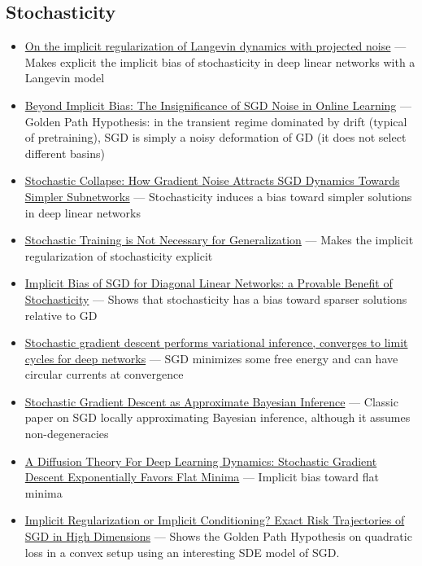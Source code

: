 \documentclass[11pt]{article}
\begin{document}
\subsection*{Stochasticity}
\begin{itemize}
  \item \href{https://arxiv.org/abs/2602.12257}{On the implicit regularization of Langevin dynamics with projected noise} --- Makes explicit the implicit bias of stochasticity in deep linear networks with a Langevin model
  \item \href{https://arxiv.org/abs/2306.08590}{Beyond Implicit Bias: The Insignificance of SGD Noise in Online Learning} --- Golden Path Hypothesis: in the transient regime dominated by drift (typical of pretraining), SGD is simply a noisy deformation of GD (it does not select different basins)
  \item \href{https://arxiv.org/abs/2306.04251}{Stochastic Collapse: How Gradient Noise Attracts SGD Dynamics Towards Simpler Subnetworks} --- Stochasticity induces a bias toward simpler solutions in deep linear networks
  \item \href{https://arxiv.org/abs/2109.14119}{Stochastic Training is Not Necessary for Generalization} --- Makes the implicit regularization of stochasticity explicit
  \item \href{https://arxiv.org/abs/2106.09524}{Implicit Bias of SGD for Diagonal Linear Networks: a Provable Benefit of Stochasticity} --- Shows that stochasticity has a bias toward sparser solutions relative to GD
  \item \href{https://arxiv.org/abs/1710.11029}{Stochastic gradient descent performs variational inference, converges to limit cycles for deep networks} --- SGD minimizes some free energy and can have circular currents at convergence
  \item \href{https://arxiv.org/abs/1704.04289}{Stochastic Gradient Descent as Approximate Bayesian Inference} --- Classic paper on SGD locally approximating Bayesian inference, although it assumes non-degeneracies
  \item \href{https://arxiv.org/abs/2002.03495}{A Diffusion Theory For Deep Learning Dynamics: Stochastic Gradient Descent Exponentially Favors Flat Minima} --- Implicit bias toward flat minima
  \item \href{https://arxiv.org/abs/2205.07069}{Implicit Regularization or Implicit Conditioning? Exact Risk Trajectories of SGD in High Dimensions} --- Shows the Golden Path Hypothesis on quadratic loss in a convex setup using an interesting SDE model of SGD.

\end{itemize}
\end{document}
